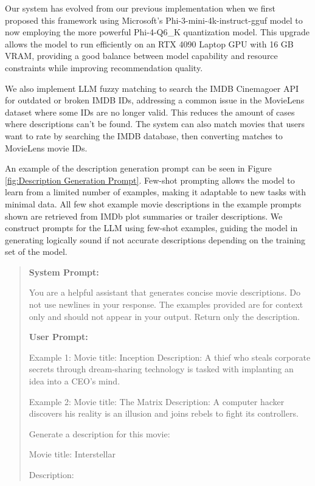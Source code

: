 \documentclass[sigconf]{acmart}
\begin{document}
Our system has evolved from our previous implementation when we first proposed this framework using Microsoft's Phi-3-mini-4k-instruct-gguf model to now employing the more powerful Phi-4-Q6\_K quantization model. This upgrade allows the model to run efficiently on an RTX 4090 Laptop GPU with 16 GB VRAM, providing a good balance between model capability and resource constraints while improving recommendation quality.

We also implement LLM fuzzy matching to search the IMDB Cinemagoer API for outdated or broken IMDB IDs, addressing a common issue in the MovieLens dataset where some IDs are no longer valid. This reduces the amount of cases where descriptions can't be found. The system can also match movies that users want to rate by searching the IMDB database, then converting matches to MovieLens movie IDs.

An example of the description generation prompt can be seen in Figure \ref{fig:Description Generation Prompt}. Few-shot prompting allows the model to learn from a limited number of examples, making it adaptable to new tasks with minimal data. All few shot example movie descriptions in the example prompts shown are retrieved from IMDb plot summaries or trailer descriptions. We construct prompts for the LLM using few-shot examples, guiding the model in generating logically sound if not accurate descriptions depending on the training set of the model.

\begin{figure*} \begin{mdframed}[linewidth=1pt] \begin{quote}\footnotesize 

\textbf{System Prompt: }

You are a helpful assistant that generates concise movie descriptions. Do not use newlines in your response. The examples provided are for context only and should not appear in your output. Return only the description.

\textbf{User Prompt:}

Example 1:
Movie title: Inception
Description: A thief who steals corporate secrets through dream-sharing technology is tasked with implanting an idea into a CEO's mind.

Example 2:
Movie title: The Matrix
Description: A computer hacker discovers his reality is an illusion and joins rebels to fight its controllers.

Generate a description for this movie:

Movie title: Interstellar

Description:
\end{quote} 
\end{mdframed} 
\caption{Description Generation Prompt with example descriptions retrieved from IMDB} 
\label{fig:Description Generation Prompt}
\end{figure*}
\end{document}
